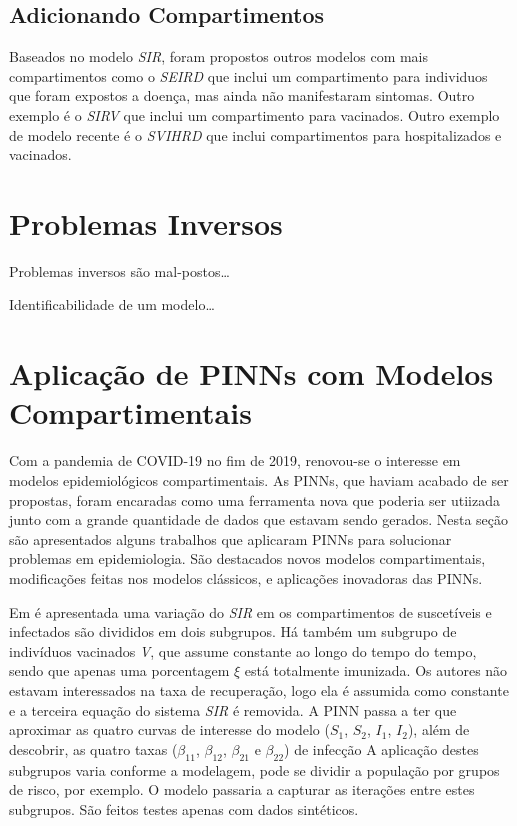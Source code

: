 \subsection{Adicionando Compartimentos}

Baseados no modelo \textit{SIR}, foram propostos outros modelos com mais 
compartimentos como o \textit{SEIRD} \cite{giles:77-sird} que inclui um 
compartimento para individuos que foram expostos a doença, mas 
ainda não manifestaram sintomas. 
Outro exemplo é o \textit{SIRV} \cite{schlickeiser-kroger:21-sirv} 
que inclui um compartimento para vacinados.
Outro exemplo de modelo recente é o \textit{SVIHRD} \cite{nelson-etal:24-japao}
que inclui compartimentos para hospitalizados e vacinados.

\section{Problemas Inversos}

Problemas inversos são mal-postos\dots

Identificabilidade de um modelo\dots

\section{Aplicação de PINNs com Modelos Compartimentais}

Com a pandemia de COVID-19 no fim de 2019, renovou-se o interesse em modelos
epidemiológicos compartimentais. As PINNs, que haviam acabado de ser propostas,
foram encaradas como uma ferramenta nova que poderia ser utiizada junto com 
a grande quantidade de dados que estavam sendo gerados. 
Nesta seção são apresentados alguns trabalhos que aplicaram PINNs para solucionar
problemas em epidemiologia. São destacados novos modelos compartimentais, 
modificações feitas nos modelos clássicos, e aplicações inovadoras das PINNs.  

Em \cite{ouyoussef-etal:24-subcompartimentos} é apresentada uma variação
do \textit{SIR} em os compartimentos de suscetíveis e infectados 
são divididos em dois subgrupos. Há também um subgrupo de indivíduos 
vacinados \textit{V}, que assume constante ao longo do tempo do tempo, 
sendo que apenas uma porcentagem $\xi$ está totalmente imunizada.
Os autores não estavam interessados na taxa de recuperação, logo ela é assumida
como constante e a terceira equação do sistema \textit{SIR} é removida. 
A PINN passa a ter que aproximar as quatro curvas de interesse do modelo 
($S_1$, $S_2$, $I_1$, $I_2$), 
além de descobrir, as quatro taxas 
($\beta_{11}$, $\beta_{12}$, $\beta_{21}$ e $\beta_{22}$) de infecção
A aplicação destes subgrupos varia conforme a modelagem, 
pode se dividir a população por grupos de risco, por exemplo.
O modelo passaria a capturar as iterações entre estes subgrupos.
São feitos testes apenas com dados sintéticos. 

